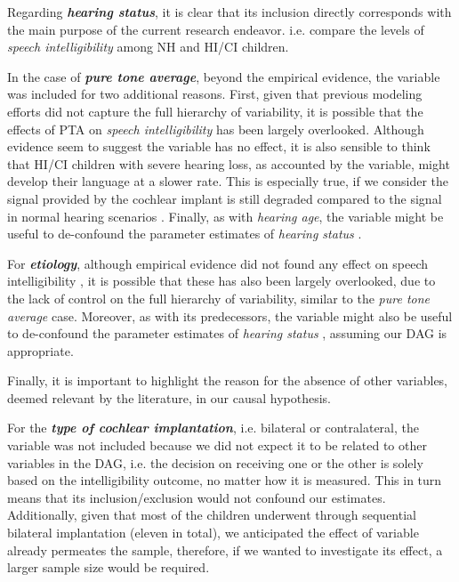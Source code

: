 Regarding \textbf{\textit{hearing status}}, it is clear that its inclusion directly corresponds with the main purpose of the current research endeavor. i.e. compare the levels of \textit{speech intelligibility} among NH and HI/CI children.

In the case of \textbf{\textit{pure tone average}}, beyond the empirical evidence, the variable was included for two additional reasons. First, given that previous modeling efforts did not capture the full hierarchy of variability, it is possible that the effects of PTA on \textit{speech intelligibility} has been largely overlooked. Although evidence seem to suggest the variable has no effect, it is also sensible to think that HI/CI children with severe hearing loss, as accounted by the variable, might develop their language at a slower rate. This is especially true, if we consider the signal provided by the cochlear implant is still degraded compared to the signal in normal hearing scenarios \cite{Drennan_et_al_2008}. Finally, as with \textit{hearing age}, the variable might be useful to de-confound the parameter estimates of \textit{hearing status} \cite{Cinelli_et_al_2021}.

For \textbf{\textit{etiology}}, although empirical evidence did not found any effect on speech intelligibility \cite{Boonen_et_al_2021}, it is possible that these has also been largely overlooked, due to the lack of control on the full hierarchy of variability, similar to the \textit{pure tone average} case. Moreover, as with its predecessors, the variable might also be useful to de-confound the parameter estimates of \textit{hearing status} \cite{Cinelli_et_al_2021}, assuming our DAG is appropriate.

Finally, it is important to highlight the reason for the absence of other variables, deemed relevant by the literature, in our causal hypothesis.

For the \textbf{\textit{type of cochlear implantation}}, i.e. bilateral or contralateral, the variable was not included because we did not expect it to be related to other variables in the DAG, i.e. the decision on receiving one or the other is solely based on the intelligibility outcome, no matter how it is measured. This in turn means that its inclusion/exclusion would not confound our estimates. Additionally, given that most of the children underwent through sequential bilateral implantation (eleven in total), we anticipated the effect of variable already permeates the sample, therefore, if we wanted to investigate its effect, a larger sample size would be required.

